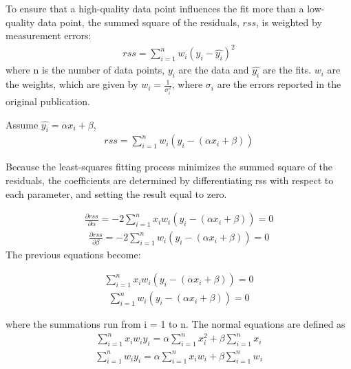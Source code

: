 \documentclass[paper=a4, fontsize=11pt]{scrartcl} %
\numberwithin{equation}{section} %
\numberwithin{figure}{section} %
\numberwithin{table}{section} %
\begin{document}
To ensure that a high-quality data point influences the fit more than a low-quality data point, the summed square of the residuals, $rss$, is weighted by measurement errors:
\begin{align}
\label{eq:WLS1}
rss= \sum\limits_{i=1}^n w_{i}\left(y_{i}-\hat {y_{i}}\right)^{2}
\end{align}
where n is the number of data points, $y_{i}$ are the data and $\hat {y_{i}}$ are the fits. $w_{i}$ are the weights, which are given by $w_{i}=\frac{1}{\sigma_{i}^2}$, where $\sigma_{i}$ are the errors reported in the original publication.

Assume $\hat {y_{i}}=\alpha x_{i}+\beta$,
\begin{align}
\label{eq:WLS3}
rss= \sum\limits_{i=1}^n w_{i}\left(y_{i}- \left(\alpha x_{i}+\beta\right)\right)
\end{align}

Because the least-squares fitting process minimizes the summed square of the residuals\footnotemark[1], the coefficients are determined by differentiating rss with respect to each parameter, and setting the result equal to zero.

\begin{align}
\label{eq:WLS4}
\frac{\partial rss}{\partial \alpha}= -2\sum\limits_{i=1}^n x_{i}w_{i}\left(y_{i}- \left(\alpha x_{i}+\beta\right)\right) =0
\end{align}
\begin{align}
\label{eq:WLS4.1}
\frac{\partial rss}{\partial \beta}= -2\sum\limits_{i=1}^n w_{i}\left(y_{i}- \left(\alpha x_{i}+\beta\right)\right) =0
\end{align}
The previous equations become:

\begin{align}
\label{eq:WLS5}
\sum\limits_{i=1}^n x_{i}w_{i}\left(y_{i}- \left(\alpha x_{i}+\beta\right)\right) =0
\end{align}
\begin{align}
\label{eq:WLS5.1}
\sum\limits_{i=1}^n w_{i}\left(y_{i}- \left(\alpha x_{i}+\beta\right)\right) =0
\end{align}

where the summations run from i = 1 to n. The normal equations are defined as
\begin{align}
\label{eq:WLS6}
\sum\limits_{i=1}^n x_{i}w_{i}y_{i}=\alpha \sum\limits_{i=1}^n x_{i}^2+\beta \sum\limits_{i=1}^n x_{i}
\end{align}
\begin{align}
\label{eq:WLS6.1}
\sum\limits_{i=1}^n w_{i}y_{i}=\alpha \sum\limits_{i=1}^n x_{i}w_{i}+ \beta \sum\limits_{i=1}^n w_{i}
\end{align}
\end{document}
